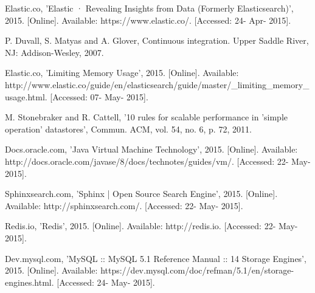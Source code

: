 \begin{thebibliography}{69}

 Elastic.co, 'Elastic · Revealing Insights from Data (Formerly Elasticsearch)', 2015. [Online]. Available: https://www.elastic.co/. [Accessed: 24- Apr- 2015].

 P. Duvall, S. Matyas and A. Glover, Continuous integration. Upper Saddle River, NJ: Addison-Wesley, 2007.

 Elastic.co, 'Limiting Memory Usage', 2015. [Online]. Available: http://www.elastic.co/guide/en/elasticsearch/guide/master/\_limiting\_memory\_usage.html. [Accessed: 07- May- 2015].

 M. Stonebraker and R. Cattell, '10 rules for scalable performance in 'simple operation' datastores', Commun. ACM, vol. 54, no. 6, p. 72, 2011. 

 Docs.oracle.com, 'Java Virtual Machine Technology', 2015. [Online]. Available: http://docs.oracle.com/javase/8/docs/technotes/guides/vm/. [Accessed: 22- May- 2015].

 Sphinxsearch.com, 'Sphinx | Open Source Search Engine', 2015. [Online]. Available: http://sphinxsearch.com/. [Accessed: 22- May- 2015].

 Redis.io, 'Redis', 2015. [Online]. Available: http://redis.io. [Accessed: 22- May- 2015].

 Dev.mysql.com, 'MySQL :: MySQL 5.1 Reference Manual :: 14 Storage Engines', 2015. [Online]. Available: https://dev.mysql.com/doc/refman/5.1/en/storage-engines.html. [Accessed: 24- May- 2015].

\end{thebibliography}
